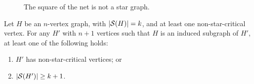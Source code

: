 \begin{figure}[!htb]
        \centering
        \caption{The square of the net is not a star graph.}
        \label{fig:square_not_star}
\end{figure}

\begin{theorem}
    \label{thm:monotonicity}
    Let $H$ be an $n$-vertex graph, with $|\mathcal{S}(H)| = k$, and at least one non-star-critical vertex.
    For any $H'$ with $n+1$ vertices such that $H$ is an induced subgraph of $H'$, at least one of the following holds:
    \begin{enumerate}
        \item $H'$ has non-star-critical vertices; or
        \item $|\mathcal{S}(H')| \geq k+1$.
    \end{enumerate}
\end{theorem}

